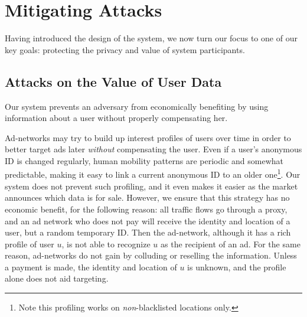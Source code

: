 \section{Mitigating Attacks}
\label{sec:security}
Having introduced the design of the system, we now turn our focus to one of our key goals: protecting the privacy and value of system participants.

\subsection{Attacks on the Value of User Data}
Our system prevents an adversary from economically benefiting by using information about a user without properly compensating her.

Ad-networks may try to build up interest profiles of users over time in order to better target ads later \emph{without} compensating the user. Even if a user's anonymous ID is changed regularly, human mobility patterns are periodic and somewhat predictable, making it easy to link a current anonymous ID to an older one\footnote{Note this profiling works on \emph{non}-blacklisted locations only.}. Our system does not prevent such profiling, and it even makes it easier as the market announces which data is for sale. However, we ensure that this strategy has no economic benefit, for the following reason: all traffic flows go through a proxy, and an ad network who does not pay will receive the identity and location of a user, but a random temporary ID. Then the ad-network, although it has a rich profile of user $u$, is not able to recognize $u$ as the recipient of an ad. For the same reason, ad-networks do not gain by colluding or reselling the information. Unless a payment is made, the identity and location of $u$ is unknown, and the profile alone does not aid targeting. %

